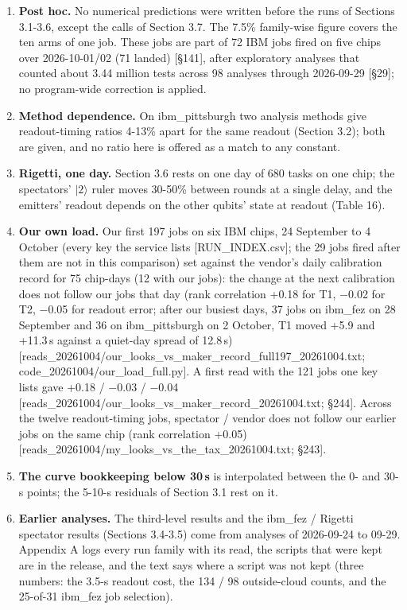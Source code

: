 \documentclass[11pt]{article}
\begin{document}
\begin{enumerate}
\item \textbf{Post hoc.} No numerical predictions were written before the runs of Sections 3.1-3.6, except the calls of Section 3.7. The 7.5\% family-wise figure covers the ten arms of one job. These jobs are part of 72 IBM jobs fired on five chips over 2026-10-01/02 (71 landed) {[}\S{}141{]}, after exploratory analyses that counted about 3.44 million tests across 98 analyses through 2026-09-29 {[}\S{}29{]}; no program-wide correction is applied.
\item \textbf{Method dependence.} On ibm\_pittsburgh two analysis methods give readout-timing ratios 4-13\% apart for the same readout (Section 3.2); both are given, and no ratio here is offered as a match to any constant.
\item \textbf{Rigetti, one day.} Section 3.6 rests on one day of 680 tasks on one chip; the spectators' \(|2\rangle\) ruler moves 30-50\% between rounds at a single delay, and the emitters' readout depends on the other qubits' state at readout (Table 16).
\item \textbf{Our own load.} Our first 197 jobs on six IBM chips, 24 September to 4 October (every key the service lists {[}RUN\_INDEX.csv{]}; the 29 jobs fired after them are not in this comparison) set against the vendor's daily calibration record for 75 chip-days (12 with our jobs): the change at the next calibration does not follow our jobs that day (rank correlation +0.18 for T1, \(-\)0.02 for T2, \(-\)0.05 for readout error; after our busiest days, 37 jobs on ibm\_fez on 28 September and 36 on ibm\_pittsburgh on 2 October, T1 moved +5.9 and +11.3\,\textmu s against a quiet-day spread of 12.8\,\textmu s) {[}reads\_20261004/our\_looks\_vs\_maker\_record\_full197\_20261004.txt; code\_20261004/our\_load\_full.py{]}. A first read with the 121 jobs one key lists gave +0.18 / \(-\)0.03 / \(-\)0.04 {[}reads\_20261004/our\_looks\_vs\_maker\_record\_20261004.txt; \S{}244{]}. Across the twelve readout-timing jobs, spectator / vendor does not follow our earlier jobs on the same chip (rank correlation +0.05) {[}reads\_20261004/my\_looks\_vs\_the\_tax\_20261004.txt; \S{}243{]}.
\item \textbf{The curve bookkeeping below 30\,\textmu s} is interpolated between the 0- and 30-\textmu s points; the 5-10-\textmu s residuals of Section 3.1 rest on it.
\item \textbf{Earlier analyses.} The third-level results and the ibm\_fez / Rigetti spectator results (Sections 3.4-3.5) come from analyses of 2026-09-24 to 09-29. Appendix A logs every run family with its read, the scripts that were kept are in the release, and the text says where a script was not kept (three numbers: the 3.5-\textmu s readout cost, the 134 / 98 outside-cloud counts, and the 25-of-31 ibm\_fez job selection).
\end{enumerate}
\end{document}
